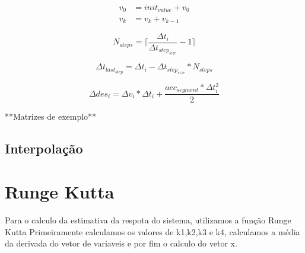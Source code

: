 \begin{equation}
    \label{eq:acumulator_function}
    \begin{split}
        v_{0} &= init_{value} + v_{0} \\
        v_k &= v_k+v_{k-1}
    \end{split}
\end{equation}

\begin{equation}
    \label{eq:N_steps}
    N_{steps} = \lceil\frac{\Delta t_i}{\Delta t_{step_{size}}}-1\rceil
\end{equation}

\begin{equation}
    \label{eq:dt_interpol_last_step}
    \Delta t_{last_{step}}= \Delta t_i - \Delta t_{step_{size}}*N_{steps} 
\end{equation}

\begin{equation}
    \label{eq:delta_des_interpol}
    \Delta des_i = \Delta v_i*\Delta t_i+ \frac{acc_{segment}*\Delta t_i^2}{2} 
\end{equation}


**Matrizes de exemplo**



\subsection{Interpolação}

\section{Runge Kutta}



    




Para o calculo da estimativa da respota do sistema, utilizamos a função Runge Kutta
Primeiramente calculamos os valores de k1,k2,k3 e k4, calculamos a média da derivada do vetor de variaveis
e por fim o calculo do vetor x.



